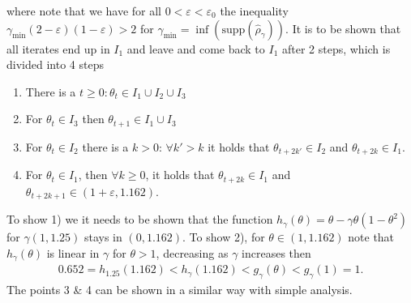 where note that we have for all $0< \varepsilon < \varepsilon_0$ the
inequality $\gamma_{\text{min}} (2-\varepsilon) (1-\varepsilon) >2$ for
$\gamma_\text{min} = \inf(\text{supp}\left(\hat{\rho}_\gamma  \right) )$.
It is to be shown that all iterates end up in $I_1$ and leave  and come back
to $I_1$ after 2 steps, which is divided into 4 steps
\begin{enumerate}
    \item There is a $t\ge 0: \theta_t \in I_1 \cup I_2 \cup I_3$
    \item For $\theta_t \in I_3$ then $\theta_{t+1} \in I_1 \cup I_3$
    \item For $\theta_t \in I_2$ there is a $k>0$: $\forall k' > k$ it holds
        that $\theta_{t+2k'} \in I_2$ and $\theta_{t+2k} \in I_1$.
    \item For $\theta_t \in I_1$, then $\forall k \ge 0$, it
        holds that
        $\theta_{t+2k} \in I_1$ and $\theta_{t+2k+1} \in
        (1+\varepsilon, 1.162)$.
\end{enumerate}
To show 1) we it needs to be shown that the function $h_\gamma(\theta)
=\theta - \gamma \theta(1- \theta^{2})$ for $\gamma(1,1.25)$ stays in $(0,
1.162)$. To show 2), for $\theta \in (1, 1.162)$ note that $h_\gamma(\theta)$
is linear in $\gamma$ for $\theta>1$, decreasing as $\gamma$ increases then
\begin{align}
    0.652 = h_{1.25}(1.162) < h_\gamma(1.162) < g_\gamma(\theta) <
    g_\gamma(1) = 1.
\end{align}
The points 3 \& 4 can be shown in a similar way with simple analysis.



